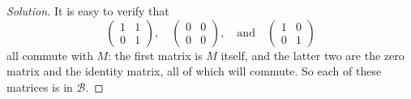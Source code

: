 \begin{proof}[Solution]
  It is easy to verify that
  \begin{equation*}
    \begin{pmatrix}
      1 & 1\\
      0 & 1
    \end{pmatrix},\quad
    \begin{pmatrix}
      0 & 0\\
      0 & 0
    \end{pmatrix},\quad\text{and}\quad
    \begin{pmatrix}
      1 & 0\\
      0 & 1
    \end{pmatrix}
  \end{equation*}
  all commute with $M$: the first matrix is $M$ itself, and the latter
  two are the zero matrix and the identity matrix, all of which will
  commute. So each of these matrices is in $\mathcal{B}$.


\end{proof}
